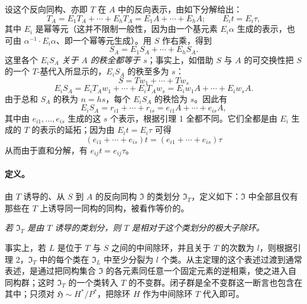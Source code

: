 设这个反向同构、亦即 \(T\) 在 \(A\) 中的反向表示，由如下分解给出：
\[
        T_A=E_1T_A+\cdots+E_hT_A
            =E_1A+\cdots+E_hA;\qquad E_it=E_i\tau,
\]
其中 \(E_i\) 是幂等元（这并不限制一般性，因为由一个基元素 \(E_i\alpha\) 生成的表示，也可由 \(\alpha^{-1}\cdot E_i\alpha\)、即一个幂等元生成）。用 \(S\) 作右乘，得到
\[
        S_A=E_1S_A+\cdots+E_hS_A .
\]
这里各个 \(E_iS_A\) \emph{关于 \(A\) 的秩全都等于 \(s\)}；事实上，如借助 \(S\) 与 \(A\) 的可交换性把 \(S\) 的一个 \(T\)-基代入所显示的，\(E_iS_A\) 的秩至多为 \(s\)：
\[
        S=Tw_1+\cdots+Tw_s
\]
\[
        E_iS_A=E_iT_Aw_1+\cdots+E_iT_Aw_s
              =E_iw_1A+\cdots+E_iw_sA .
\]
由于总和 \(S_A\) 的秩为 \(n=hs\)，每个 \(E_iS_A\) 的秩恰为 \(s\)。因此有
\[
        E_iS_A=r_{i1}+\cdots+r_{is}
              =e_{i1}A+\cdots+e_{is}A,
\]
其中由 \(e_{i1},\ldots,e_{is}\) 生成的这 \(s\) 个表示，根据引理 1 全都不同。它们全都是由 \(E_i\) 生成的 \(T\) 的表示的延拓；因为由 \(E_it=E_i\tau\) 可得
\[
        (e_{i1}+\cdots+e_{is})t=(e_{i1}+\cdots+e_{is})\tau
\]
从而由于直和分解，有 \(e_{ij}t=e_{ij}\tau\)。

\paragraph{定义。}
由 \(T\) 诱导的、从 \(S\) 到 \(A\) 的反向同构 \(\mathfrak I\) 的类划分 \(\mathfrak I_T\)，定义如下：\(\mathfrak I\) 中全部且仅有那些在 \(T\) 上诱导同一同构的同构，被看作等价的。

\noindent\textbf{} \emph{若 \(\mathfrak I_T\) 是由 \(T\) 诱导的类划分，则 \(T\) 是相对于这个类划分的极大子除环。}

事实上，若 \(L\) 是位于 \(T\) 与 \(S\) 之间的中间除环，并且关于 \(T\) 的次数为 \(l\)，则根据引理 2，\(\mathfrak I_T\) 中的每个类在 \(\mathfrak I_L\) 中至少分裂为 \(l\) 个类。从主定理的这个表述过渡到通常表述，是通过把同构集合 \(\mathfrak I\) 的各元素同任意一个固定元素的逆相乘，使之进入自同构群；这时 \(\mathfrak I_T\) 的一个类转入 \(T\) 的不变群。闭子群是全不变群这一断言也包含在其中；只须对 \(\mathfrak H\sim H^*/P^*\)，把除环 \(H\) 作为中间除环 \(T\) 代入即可。
